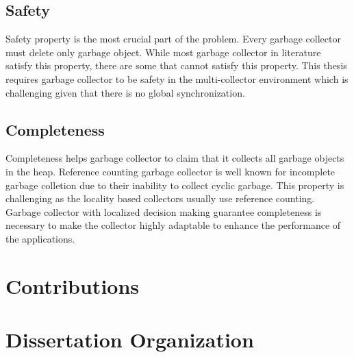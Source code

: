 \subsection{Safety}
	Safety property is the most crucial part of the problem. Every garbage collector must delete only garbage object. While most garbage collector in literature satisfy this property, there are some that cannot satisfy this property. This thesis requires garbage collector to be safety in the multi-collector environment which is challenging given that there is no global synchronization.
\subsection{Completeness}
	Completeness helps garbage collector to claim that it collects all garbage objects in the heap. Reference counting garbage collector is well known for incomplete garbage colletion due to their inability to collect cyclic garbage. This property is challenging as the locality based collectors usually use reference counting. Garbage collector with localized decision making guarantee completeness is necessary to make the collector highly adaptable to enhance the performance of the applications.
\section{Contributions}
\label{intro:contr}
\section{Dissertation Organization}
\label{intro:do}